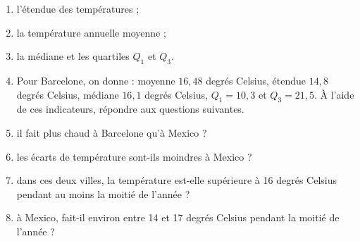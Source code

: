 {\small
  \begin{enumerate}[itemsep=0pt, topsep=2pt, parsep=0pt]

  \item l'étendue des températures ;
  \item la température annuelle moyenne ;
  \item la médiane et les quartiles $Q_1$ et $Q_3$.
\item Pour Barcelone, on donne : moyenne $16,48$ degrés Celsius, étendue $14,8$ degrés Celsius, médiane $16,1$ degrés Celsius, $Q_1=10,3$ et $Q_3=21,5$.
À l'aide de ces indicateurs, répondre aux questions suivantes.
  \item il fait plus chaud à Barcelone qu'à Mexico ?
  \item les écarts de température sont-ils moindres à Mexico ?
  \item dans ces deux villes, la température est-elle supérieure à 16 degrés Celsius pendant au moins la moitié de l'année ?
  \item à Mexico, fait-il environ entre 14 et 17 degrés Celsius pendant la moitié de l'année ?
  
  \end{enumerate}
}
